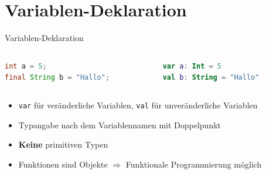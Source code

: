 \documentclass{beamer}
\begin{document}
\section{Variablen-Deklaration}
\begin{frame}[fragile]{Variablen-Deklaration}
  \begin{columns}
    \begin{column}{0.5\textwidth}
      \begin{lstlisting}[language=Java, title=Java, xleftmargin=1em]
int a = 5;
final String b = "Hallo";
      \end{lstlisting}
    \end{column}
    \begin{column}{0.5\textwidth}
      \begin{lstlisting}[language=Kotlin, title=Kotlin, xleftmargin=1em, numbers=none]
var a: Int = 5
val b: String = "Hallo"
      \end{lstlisting}
    \end{column}
  \end{columns}
  \pause[]\vspace{0.5cm}
  \begin{itemize}[<+->]
    \item \texttt{var} für veränderliche Variablen, \texttt{val} für unveränderliche Variablen
    \item Typangabe nach dem Variablennamen mit Doppelpunkt
    \item \textbf{Keine} primitiven Typen %
    \item Funktionen sind Objekte $\Rightarrow$ Funktionale Programmierung möglich
  \end{itemize}
\end{frame}
\end{document}
